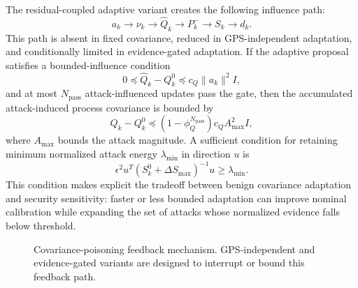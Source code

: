 \documentclass[conference]{IEEEtran}
\begin{document}
The residual-coupled adaptive variant creates the following influence path:
\begin{equation}
    a_k \rightarrow \nu_k \rightarrow \widehat{Q}_k
    \rightarrow P_k^- \rightarrow S_k \rightarrow d_k.
\end{equation}
This path is absent in fixed covariance, reduced in GPS-independent
adaptation, and conditionally limited in evidence-gated adaptation. If the
adaptive proposal satisfies a bounded-influence condition
\begin{equation}
    0 \preceq \widehat{Q}_k-Q_k^0 \preceq c_Q\|a_k\|^2 I,
\end{equation}
and at most $N_{\mathrm{pass}}$ attack-influenced updates pass the gate, then
the accumulated attack-induced process covariance is bounded by
\begin{equation}
    Q_k-Q_k^0 \preceq
    (1-\phi_Q^{N_{\mathrm{pass}}})c_Q A_{\max}^2 I,
\end{equation}
where $A_{\max}$ bounds the attack magnitude. A sufficient condition for
retaining minimum normalized attack energy $\lambda_{\min}$ in direction $u$
is
\begin{equation}
    \epsilon^2 u^T
    \left(S_k^0+\Delta S_{\max}\right)^{-1}u
    \geq \lambda_{\min}.
\end{equation}
This condition makes explicit the tradeoff between benign covariance
adaptation and security sensitivity: faster or less bounded adaptation can
improve nominal calibration while expanding the set of attacks whose
normalized evidence falls below threshold.

\begin{figure}[t]
\centering
{}
\caption{Covariance-poisoning feedback mechanism. GPS-independent and evidence-gated variants are designed to interrupt or bound this feedback path.}
\label{fig:covariance_causal}
\end{figure}
\end{document}
